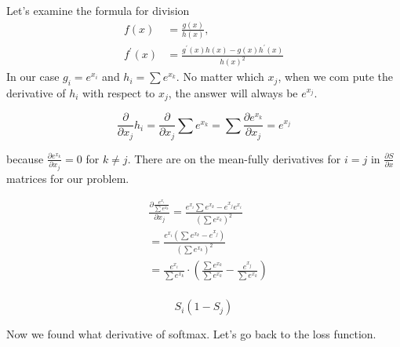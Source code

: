 \documentclass{article}
\begin{document}
Let's examine the formula for division
\begin{align*}
f(x)&=\frac{g(x)}{h(x)}, \quad \\ f^{\prime}(x)&=\frac{g^{\prime}(x) h(x)-g(x) h^{\prime}(x)}{h(x)^{2}} 
\end{align*}
In our case $g_{i}=e^{x_{i}}$ and $h_{i}=\sum e^{x_{k}}$. No matter which $x_{j}$, when we com pute the derivative of $h_{i}$ with respect to $x_{j}$, the answer will always be $e^{x_{j}}$.

$$
\frac{\partial}{\partial x_{j}} h_{i}=\frac{\partial}{\partial x_{j}} \sum e^{x_{k}}=\sum \frac{\partial e^{x_{k}}}{\partial x_{j}}=e^{x_{j}}
$$

because $\frac{\partial e^{x_{k}}}{\partial x_{j}}=0$ for $k \neq j$. There are on the mean-fully derivatives for $i=j$ in $\frac{\partial S}{\partial x}$ matrices for our problem.


\begin{align*}
& \frac{\partial \frac{e^{x_{i}}}{\sum e^{x_{k}}}}{\partial x_{j}}=\frac{e^{x_{i}} \sum e^{x_{k}}-e^{x_{j}} e^{x_{i}}}{\left(\sum e^{x_{k}}\right)^{2}} \\
& =\frac{e^{x_{i}}\left(\sum e^{x_{k}}-e^{x_{j}}\right)}{\left(\sum e^{x_{k}}\right)^{2}} \\
& =\frac{e^{x_{i}}}{\sum e^{x_{k}}} \cdot\left(\frac{\sum e^{x_{k}}}{\sum e^{x_{k}}}-\frac{e^{x_{j}}}{\sum e^{x_{k}}}\right) \\
\end{align*}

\begin{equation}
\label{eqn:partial_softmax}
    S_{i}\left(1-S_{j}\right)
\end{equation}

Now we found what derivative of softmax. Let's go back to the loss function.
\end{document}
